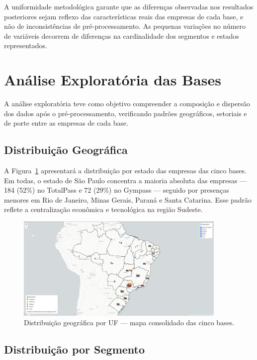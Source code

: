 A uniformidade metodológica garante que as diferenças observadas nos resultados posteriores sejam reflexo das características reais das empresas de cada base, e não de inconsistências de pré-processamento. As pequenas variações no número de variáveis decorrem de diferenças na cardinalidade dos segmentos e estados representados.

\section{Análise Exploratória das Bases}

A análise exploratória teve como objetivo compreender a composição e dispersão dos dados após o pré-processamento, verificando padrões geográficos, setoriais e de porte entre as empresas de cada base.

\subsection{Distribuição Geográfica}

A Figura~\ref{fig:map} apresentará a distribuição por estado das empresas das cinco bases. Em todas, o estado de São Paulo concentra a maioria absoluta das empresas — 184 (52\%) no TotalPass e 72 (29\%) no Gympass — seguido por presenças menores em Rio de Janeiro, Minas Gerais, Paraná e Santa Catarina. Esse padrão reflete a centralização econômica e tecnológica na região Sudeste.

\begin{figure}[H]
    \centering
    \includegraphics[width=0.9\textwidth]{imagens/Map.jpeg}
    \caption{Distribuição geográfica por UF — mapa consolidado das cinco bases.}
    \label{fig:map}
\end{figure}

\subsection{Distribuição por Segmento}

